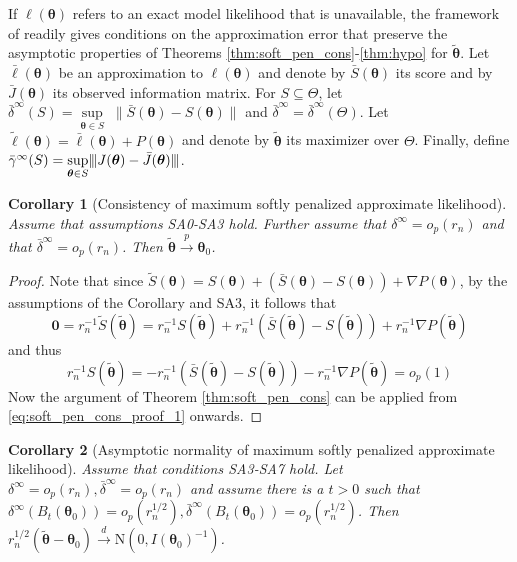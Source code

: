 \documentclass[11pt, a4paper]{article}
\newcommand*{\bb}{\boldsymbol}
\newcommand{\mnorms}[1]{{\vert\kern-0.25ex\vert\kern-0.25ex\vert #1 
		\vert\kern-0.25ex\vert\kern-0.25ex\vert}}
\theoremstyle{example} \newtheorem{example}{Example}[section]
\theoremstyle{theorem} \newtheorem{theorem}{Theorem}[section]
\theoremstyle{theorem }\newtheorem{proposition}{Proposition}[section]
\theoremstyle{theorem }\newtheorem{corollary}{Corollary}[section]
\def\btheta{\bb{\theta}}
\def\b0{\bb{0}}
\def\btnod{\bb{\theta}_0}
\def\bttilde{\tilde{\bb{\theta}}}
\begin{document}
	If $\ell(\btheta)$ refers to an exact model likelihood that is unavailable, the framework of \citet{ogden:2017} readily gives conditions on the approximation error that preserve the asymptotic properties of Theorems \ref{thm:soft_pen_cons}-\ref{thm:hypo} for $\bttilde$. Let $\bar{\ell}(\btheta)$ be an approximation to $\ell(\btheta)$ and denote by $\bar{S}(\btheta)$ its score and by $\bar{J}(\btheta)$ its observed information matrix. For $S\subseteq \Theta$, let $\bar{\delta}^\infty(S) = \underset{\btheta \in S}{\sup} \; \| \bar{S}(\btheta)-S(\btheta)\|$ and $\bar{\delta}^\infty = \bar{\delta}^\infty(\Theta)$. Let $\tilde{\ell}(\btheta) = \bar{\ell}(\btheta)+P(\btheta)$ and denote by $\bttilde$ its maximizer over $\Theta$. Finally, define $\bar{\gamma}^\infty(S) = \underset{\btheta \in S}{\sup} \mnorms{J(\btheta)-\bar{J}(\btheta)}$.
	\begin{corollary}[Consistency of maximum softly penalized approximate likelihood] \label{cor:cons}
		Assume that assumptions SA0-SA3 hold. Further assume that $\delta^\infty = o_p(r_n)$ and that $\bar{\delta}^\infty = o_p(r_n)$. Then $\bttilde \overset{p}{\to} \btnod$. 
	\end{corollary}
	\begin{proof}
		Note that since $\tilde{S}(\btheta) = S(\btheta) + (\bar{S}(\btheta)-{S}(\btheta)) + \nabla P(\btheta)$, by the assumptions of the Corollary and SA3, it follows that 
		\begin{equation}
			\b0 = r_n^{-1}\tilde{S}(\bttilde) = r_n^{-1}{S}(\bttilde) + r_n^{-1}(\bar{S}(\bttilde)-{S}(\bttilde)) + r_n^{-1}\nabla P(\bttilde)
		\end{equation}
		and thus 
		\begin{equation}
			r_n^{-1}{S}(\bttilde) = - r_n^{-1}(\bar{S}(\bttilde)-{S}(\bttilde)) - r_n^{-1}\nabla P(\bttilde) = o_p(1)
		\end{equation}
		Now the argument of Theorem \ref{thm:soft_pen_cons} can be applied from \eqref{eq:soft_pen_cons_proof_1} onwards.
	\end{proof}
	\begin{corollary}[Asymptotic normality of maximum softly penalized approximate likelihood]\label{cor:asymp_norm}
		Assume that conditions SA3-SA7 hold. Let $\delta^\infty =   o_p(r_n),\bar{\delta}^\infty = o_p(r_n) $ and assume there is a $t>0$ such that $\delta^{\infty}(B_t(\btnod)) = o_p(r_n^{1/2}),\bar{\delta}^{\infty}(B_t(\btnod)) = o_p(r_n^{1/2})$. Then 
		$r_n^{1/2}(\bttilde-\btnod) \overset{d}{\to} \text{N}(0,I(\btnod)^{-1})$. 
	\end{corollary} 
\end{document}
